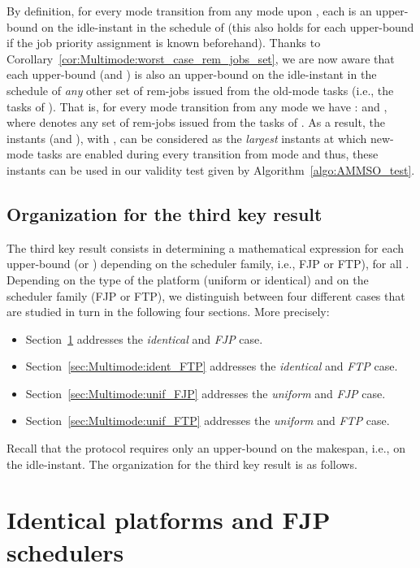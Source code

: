 \documentclass{article}
\newtheorem{validity test}{Validity Test}
\begin{document}
By definition, for every mode transition from any mode  upon , each  is an upper-bound on the  idle-instant in the schedule of  (this also holds for each upper-bound  if the job priority assignment  is known beforehand). Thanks to Corollary~\ref{cor:Multimode:worst_case_rem_jobs_set}, we are now aware that each upper-bound  (and ) is also an upper-bound on the  idle-instant in the schedule of \emph{any} other set of rem-jobs issued from the old-mode tasks (i.e., the tasks of ). That is, for every mode transition from any mode  we have :
 \mbox{and} , where  denotes any set of rem-jobs issued from the tasks of . As a result, the instants  (and ), with , can be considered as the \emph{largest} instants at which new-mode tasks are enabled during every transition from mode  and thus, these instants can be used in our validity test given by Algorithm~\ref{algo:AMMSO_test}. 

\subsection{Organization for the third key result}
The third key result consists in determining a mathematical expression for each upper-bound  (or ) depending on the scheduler family, i.e., FJP or FTP), for all . Depending on the type of the platform (uniform or identical) and on the scheduler family (FJP or FTP), we distinguish between four different cases that are studied in turn in the following four sections. More precisely:

\begin{itemize}
\renewcommand{\labelitemi}{}
\item Section~\ref{sec:Multimode:ident_FJP} addresses the \emph{identical} and \emph{FJP} case.
\item Section~\ref{sec:Multimode:ident_FTP} addresses the \emph{identical} and \emph{FTP} case. 
\item Section~\ref{sec:Multimode:unif_FJP} addresses the \emph{uniform} and \emph{FJP} case.
\item Section~\ref{sec:Multimode:unif_FTP} addresses the \emph{uniform} and \emph{FTP} case. 
\end{itemize}

Recall that the protocol  requires only an upper-bound on the makespan, i.e., on the  idle-instant. The organization for the third key result is as follows. 




\section{Identical platforms and FJP schedulers}
\label{sec:Multimode:ident_FJP}
\end{document}
